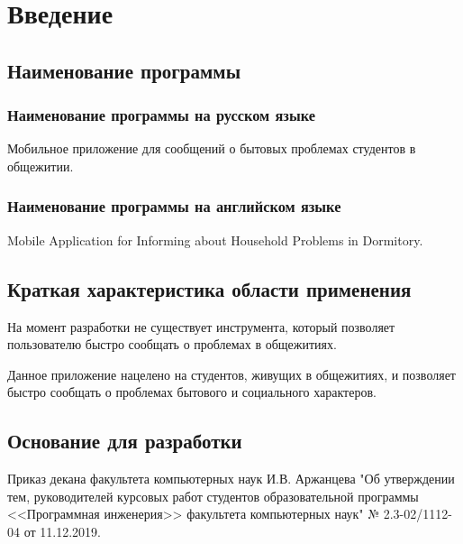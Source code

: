 \section{Введение}

\subsection{Наименование программы}

\subsubsection{Наименование программы на русском языке}

Мобильное приложение для сообщений о бытовых проблемах студентов в общежитии.

\subsubsection{Наименование программы на английском языке}

Mobile Application for Informing about Household Problems in Dormitory.

\subsection{Краткая характеристика области применения}

На момент разработки не существует инструмента, который позволяет пользователю быстро сообщать о проблемах в общежитиях.

Данное приложение нацелено на студентов, живущих в общежитиях, и позволяет быстро сообщать о проблемах бытового и социального характеров.

\subsection{Основание для разработки}

Приказ декана факультета компьютерных наук И.В. Аржанцева "Об утверждении тем, руководителей курсовых работ студентов образовательной программы <<Программная инженерия>> факультета компьютерных наук" № 2.3-02/1112-04 от 11.12.2019.

